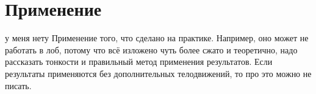 
\section{Применение}
у меня нету
Применение того, что сделано на практике. Например, оно может не работать в лоб, потому что всё изложено чуть более сжато и теоретично, надо рассказать тонкости и правильный метод применения результатов. Если результаты применяются без до\-полнительных телодвижений, то про это можно не писать.
